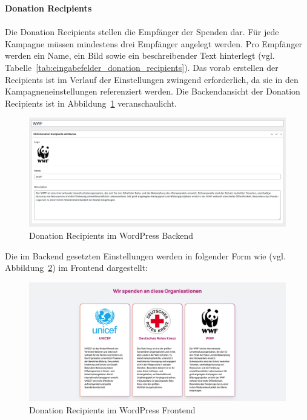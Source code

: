 \textbf{Donation Recipients}\\\\
Die Donation Recipients stellen die Empfänger der Spenden dar.
Für jede Kampagne müssen mindestens drei Empfänger angelegt werden.
Pro Empfänger werden ein Name, ein Bild sowie ein beschreibender Text hinterlegt (vgl. Tabelle~\ref{tab:eingabefelder_donation_recipients}).
Das vorab erstellen der Recipients ist im Verlauf der Einstellungen zwingend erforderlich, da sie in den Kampagneneinstellungen referenziert werden.
Die Backendansicht der Donation Recipients ist in Abbildung~\ref{fig:donation-recipients-settings-legacy} veranschaulicht.
\begin{figure}[H]
    \centering
    \includegraphics[width=1\textwidth]{images/legacy_donation_recipients_backend}
    \caption{Donation Recipients im WordPress Backend}
    \label{fig:donation-recipients-settings-legacy}
\end{figure}
Die im Backend gesetzten Einstellungen werden in folgender Form wie (vgl. Abbildung~\ref{fig:donation-recipients-frontend-legacy}) im Frontend dargestellt:
\begin{figure}[H]
    \centering
    \includegraphics[width=1\textwidth]{images/legacy_donation_recipients_frontend}
    \caption{Donation Recipients im WordPress Frontend}
    \label{fig:donation-recipients-frontend-legacy}
\end{figure}

